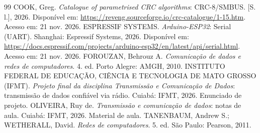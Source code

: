\documentclass[12pt, oneside, a4paper, sumario=tradicional, chapter=TITLE, brazilian]{abntex2}
\begin{document}
\postextual

\begin{thebibliography}{99}
 COOK, Greg. \textit{Catalogue of parametrised CRC algorithms}: CRC-8/SMBUS. [S. l.], 2026. Disponível em: \url{https://reveng.sourceforge.io/crc-catalogue/1-15.htm}. Acesso em: 21 nov. 2026.
 ESPRESSIF SYSTEMS. \textit{Arduino-ESP32}: Serial (UART). Shanghai: Espressif Systems, 2026. Disponível em: \url{https://docs.espressif.com/projects/arduino-esp32/en/latest/api/serial.html}. Acesso em: 21 nov. 2026.
 FOROUZAN, Behrouz A. \textit{Comunicação de dados e redes de computadores}. 4. ed. Porto Alegre: AMGH, 2010.
 INSTITUTO FEDERAL DE EDUCAÇÃO, CIÊNCIA E TECNOLOGIA DE MATO GROSSO (IFMT). \textit{Projeto final da disciplina Transmissão e Comunicação de Dados}: transmissão de dados confiável via rádio. Cuiabá: IFMT, 2026. Enunciado de projeto.
 OLIVEIRA, Ruy de. \textit{Transmissão e comunicação de dados}: notas de aula. Cuiabá: IFMT, 2026. Material de aula.
 TANENBAUM, Andrew S.; WETHERALL, David. \textit{Redes de computadores}. 5. ed. São Paulo: Pearson, 2011.
\end{thebibliography}
\end{document}
